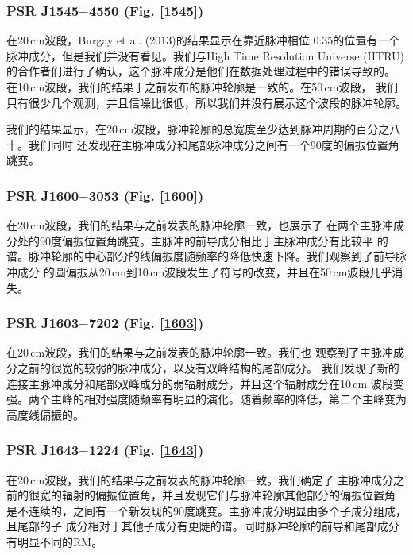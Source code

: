 \subsubsection{PSR J1545$-$4550 (Fig. \ref{1545})}

在20\,cm波段，Burgay et al. (2013)\supercite{Burgay13}的结果显示在靠近脉冲相位
0.35的位置有一个脉冲成分，但是我们并没有看见。我们与High Time Resolution 
Universe (HTRU)的合作者们进行了确认，这个脉冲成分是他们在数据处理过程中的错误导致的。
在10\,cm波段，我们的结果于之前发布的脉冲轮廓是一致的\supercite{Burgay13}。在50\,cm波段，
我们只有很少几个观测，并且信噪比很低，所以我们并没有展示这个波段的脉冲轮廓。

我们的结果显示，在20\,cm波段，脉冲轮廓的总宽度至少达到脉冲周期的百分之八十。我们同时
还发现在主脉冲成分和尾部脉冲成分之间有一个90度的偏振位置角跳变。

\subsubsection{PSR J1600$-$3053 (Fig. \ref{1600})}

在20\,cm波段，我们的结果与之前发表的脉冲轮廓一致\supercite{Ord04,Yan11a}，也展示了
在两个主脉冲成分处的90度偏振位置角跳变。主脉冲的前导成分相比于主脉冲成分有比较平
的谱。脉冲轮廓的中心部分的线偏振度随频率的降低快速下降。我们观察到了前导脉冲成分
的圆偏振从20\,cm到10\,cm波段发生了符号的改变，并且在50\,cm波段几乎消失。

\subsubsection{PSR J1603$-$7202 (Fig. \ref{1603})}

在20\,cm波段，我们的结果与之前发表的脉冲轮廓一致\supercite{Ord04,Yan11a}。我们也
观察到了主脉冲成分之前的很宽的较弱的脉冲成分，以及有双峰结构的尾部成分。
我们发现了新的连接主脉冲成分和尾部双峰成分的弱辐射成分，并且这个辐射成分在10\,cm
波段变强。两个主峰的相对强度随频率有明显的演化。随着频率的降低，第二个主峰变为
高度线偏振的。

\subsubsection{PSR J1643$-$1224 (Fig. \ref{1643})}

在20\,cm波段，我们的结果与之前发表的脉冲轮廓一致\supercite{Ord04,Yan11a}。我们确定了
主脉冲成分之前的很宽的辐射的偏振位置角，并且发现它们与脉冲轮廓其他部分的偏振位置角
是不连续的，之间有一个新发现的90度跳变。主脉冲成分明显由多个子成分组成，且尾部的子
成分相对于其他子成分有更陡的谱。同时脉冲轮廓的前导和尾部成分有明显不同的RM。

